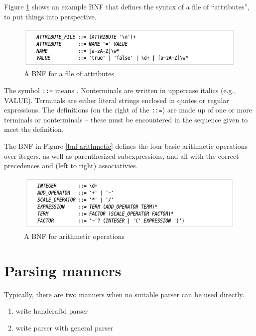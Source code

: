 Figure \ref{fig:bnf-attributes} shows an example BNF that defines the syntax of a file of ``attributes'', to put things into perspective.

\begin{figure}[!ht]
  \centering
  \includegraphics[width=\textwidth]{pics/a-bnf-for-a-file-of-attributes}
  \caption{A BNF for a file of attributes}
  \label{fig:bnf-attributes}
\end{figure}


The symbol \verb|::=| means .
Nonterminals are written in uppercase italics (e.g., VALUE).
Terminals are either literal strings enclosed in quotes or regular expressions.
The definitions (on the right of the \verb|::=|) are made up of one or more terminals or nonterminals -- these must be encountered in the sequence given to meet the definition.




The BNF in Figure \ref{bnf-arithmetic} defines the four basic arithmetic operations over itegers, as well as parenthesized subexpressions, and all with the correct precedences and (left to right) associativies.
\begin{figure}[!ht]
  \centering
  \includegraphics[width=\textwidth]{pics/bnf-arithmetic}
  \caption{A BNF for arithmetic operations}
  \label{fig:bnf-arithmetic}
\end{figure}

\section{Parsing manners}

Typically, there are two manners when no suitable parser can be used directly.
\begin{enumerate}
\item write handcraftd parser
\item write parser with general parser
\end{enumerate}



